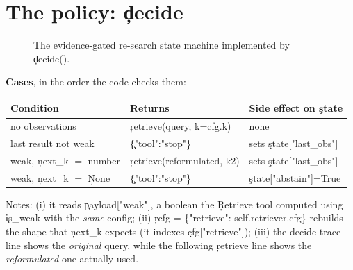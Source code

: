 \section{The policy: \c{decide}}
\begin{figure}[h]\centering
{}
\caption{The evidence-gated re-search state machine implemented by \c{decide()}.}
\end{figure}
\textbf{Cases}, in the order the code checks them:
\begin{center}\begin{tabular}{@{}p{4.2cm}p{4.2cm}p{5.5cm}@{}}\toprule
Condition & Returns & Side effect on \c{state} \\ \midrule
no observations & \c{retrieve(query, k=cfg.k)} & none \\
last result not weak & \c{\{"tool":"stop"\}} & sets \c{state["last\_obs"]} \\
weak, \c{next\_k} $=$ number & \c{retrieve(reformulated, k2)} & sets \c{state["last\_obs"]} \\
weak, \c{next\_k} $=$ \c{None} & \c{\{"tool":"stop"\}} & \c{state["abstain"]=True} \\
\bottomrule\end{tabular}\end{center}
Notes: (i) it reads \c{payload["weak"]}, a boolean the \c{Retrieve} tool computed using \c{is\_weak} with the \emph{same} config; (ii) \c{rcfg = \{"retrieve": self.retriever.cfg\}} rebuilds the shape that \c{next\_k} expects (it indexes \c{cfg["retrieve"]}); (iii) the decide trace line shows the \emph{original} query, while the following \c{retrieve} line shows the \emph{reformulated} one actually used.
